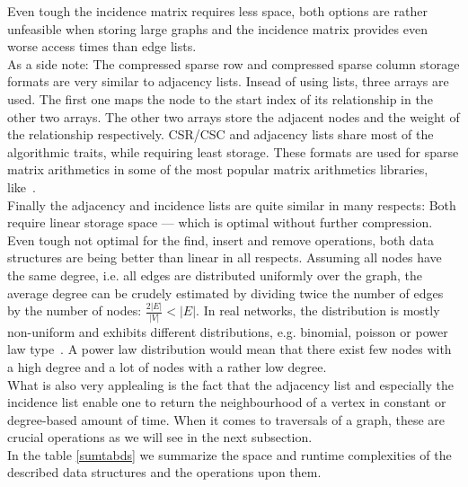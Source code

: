         Even tough the incidence matrix requires less space, both options are rather unfeasible when storing large graphs and the incidence matrix provides even worse access times than edge lists. \\
        
        As a side note: The compressed sparse row and compressed sparse column storage formats are very similar to adjacency lists. Insead of using lists, three arrays are used. The first one maps the node to the start index of its relationship in the other two arrays. The other two arrays store the adjacent nodes and the weight of the relationship respectively. CSR/CSC and adjacency lists share most of the algorithmic traits, while requiring least storage. These formats are used for sparse matrix arithmetics in some of the most popular matrix arithmetics libraries, like~\autocite{MatrixStorageSchemes-2021-03-05, EigenTheMatrixclass-2020-12-05, MatrixStorageSchemes-1999-10-01}.  \\
        
        Finally the adjacency and incidence lists are quite similar in many respects: Both require linear storage space --- which is optimal without further compression. Even tough not optimal for  the find, insert and remove operations, both data structures are being better than linear in all respects. Assuming all nodes have the same degree, i.e. all edges are distributed uniformly over the graph, the average degree can be crudely estimated by dividing twice the number of edges by the number of nodes: $\frac{2|E|}{|V|} < |E|$. In real networks, the distribution is mostly non-uniform and exhibits different distributions, e.g. binomial, poisson or power law type~\autocite{holme2019rare}. A power law distribution would mean that there exist few nodes with a high degree and a lot of nodes with a rather low degree. \\
        What is also very applealing is the fact that the adjacency list and especially the incidence list enable one to return the neighbourhood of a vertex in constant or degree-based amount of time. When it comes to traversals of a graph, these are crucial operations as we will see in the next subsection. \\
        
        In the table \ref{sumtabds} we summarize the space and runtime complexities of the described data structures and the operations upon them. 
                
